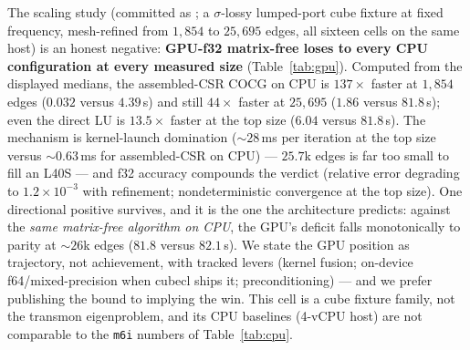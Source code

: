 \documentclass{anvil-paper}
\begin{document}
The scaling study (committed as
; a $\sigma$-lossy
lumped-port cube fixture at fixed frequency, mesh-refined from $1{,}854$
to $25{,}695$ edges, all sixteen cells on the same host) is an honest
negative: \textbf{GPU-f32 matrix-free loses to every CPU configuration
at every measured size} (Table~\ref{tab:gpu}). Computed from the
displayed medians, the assembled-CSR COCG on CPU is $137\times$ faster
at $1{,}854$ edges ($0.032$ versus $4.39$\,s) and still $44\times$
faster at $25{,}695$ ($1.86$ versus $81.8$\,s); even the direct LU is
$13.5\times$ faster at the top size ($6.04$ versus $81.8$\,s). The
mechanism is kernel-launch domination (${\sim}28$\,ms per iteration at
the top size versus ${\sim}0.63$\,ms for assembled-CSR on CPU) ---
$25.7$k edges is far too small to fill an L40S --- and f32 accuracy
compounds the verdict (relative error degrading to $1.2\times10^{-3}$
with refinement; nondeterministic convergence at the top size). One
directional positive survives, and it is the one the architecture
predicts: against the \emph{same matrix-free algorithm on CPU}, the
GPU's deficit falls monotonically to parity at ${\sim}26$k edges
($81.8$ versus $82.1$\,s). We state the GPU position as trajectory, not
achievement, with tracked levers (kernel fusion; on-device
f64/mixed-precision when cubecl ships it; preconditioning) --- and we
prefer publishing the bound to implying the win. This cell is a cube
fixture family, not the transmon eigenproblem, and its CPU baselines
(4-vCPU host) are not comparable to the \texttt{m6i} numbers of
Table~\ref{tab:cpu}.
\end{document}
